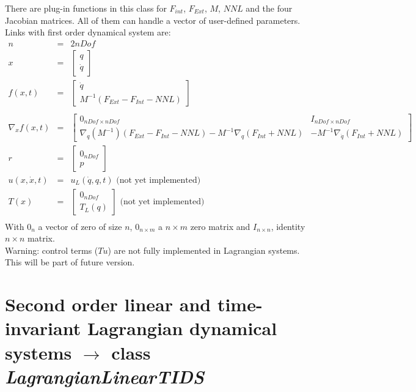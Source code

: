 \documentclass[10pt]{report}
\begin{document}
There are plug-in functions in this class for $F_{int}$, $F_{Ext}$, $M$, $NNL$ and the four Jacobian matrices. All
of them can handle a vector of user-defined parameters. \\

Links with first order dynamical system are: 
\begin{eqnarray}
  n &= &2nDof \\
  x &=&\left[\begin{array}{c}q \\ \dot q \end{array}\right] \\
  f(x,t) &=&  \left[\begin{array}{c} \dot q \\ M^{-1}(F_{Ext}-F_{Int}-NNL) \end{array}\right] \\
  \\
  \nabla_x f(x,t) &=& 
  \left[\begin{array}{cc} 
      0_{nDof\times nDof} & I_{nDof\times nDof} \\
      \nabla_q(M^{-1})(F_{Ext}-F_{Int}-NNL) -M^{-1}\nabla_q(F_{Int}+NNL) &  -M^{-1}\nabla_{\dot q}(F_{Int}+NNL) 
    \end{array}\right] \\
  r &=& \left[\begin{array}{c} 0_{nDof} \\ p \end{array}\right] \\
  u(x,\dot x,t) &=& u_L(\dot q, q, t) \text{  (not yet implemented)} \\
  T(x) &=& \left[\begin{array}{c} 0_{nDof} \\ T_L(q) \end{array}\right] \text{  (not yet implemented)} \\
\end{eqnarray}
With $0_{n}$ a vector of zero of size $n$, $0_{n\times m}$ a $n\times m$ zero matrix and
$I_{n\times n}$, identity $n\times n$ matrix. \\

Warning: control terms ($Tu$) are not fully implemented in Lagrangian systems. This will be part of future version.

\section{Second order linear and time-invariant Lagrangian dynamical systems $\rightarrow$ class \it{LagrangianLinearTIDS}}
\end{document}
